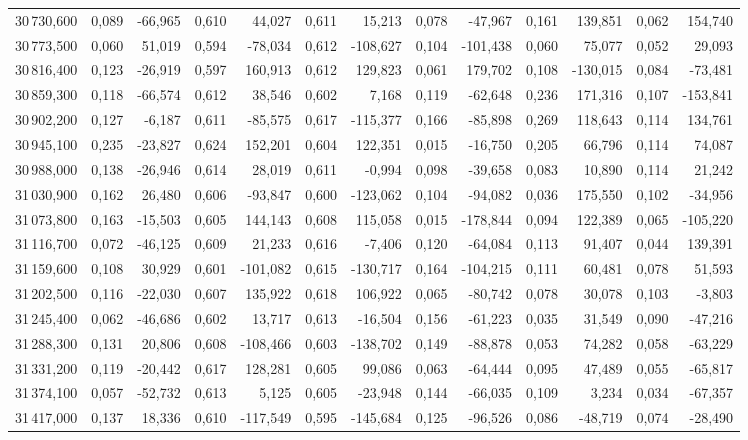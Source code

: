 \begin{longtable}{rrrrrrrrrrrrr}
30\,730,600 & 0,089 & -66,965 & 0,610 & 44,027 & 0,611 & 15,213 & 0,078 & -47,967 & 0,161 & 139,851 & 0,062 & 154,740\\
30\,773,500 & 0,060 & 51,019 & 0,594 & -78,034 & 0,612 & -108,627 & 0,104 & -101,438 & 0,060 & 75,077 & 0,052 & 29,093\\
30\,816,400 & 0,123 & -26,919 & 0,597 & 160,913 & 0,612 & 129,823 & 0,061 & 179,702 & 0,108 & -130,015 & 0,084 & -73,481\\
30\,859,300 & 0,118 & -66,574 & 0,612 & 38,546 & 0,602 & 7,168 & 0,119 & -62,648 & 0,236 & 171,316 & 0,107 & -153,841\\
30\,902,200 & 0,127 & -6,187 & 0,611 & -85,575 & 0,617 & -115,377 & 0,166 & -85,898 & 0,269 & 118,643 & 0,114 & 134,761\\
30\,945,100 & 0,235 & -23,827 & 0,624 & 152,201 & 0,604 & 122,351 & 0,015 & -16,750 & 0,205 & 66,796 & 0,114 & 74,087\\
30\,988,000 & 0,138 & -26,946 & 0,614 & 28,019 & 0,611 & -0,994 & 0,098 & -39,658 & 0,083 & 10,890 & 0,114 & 21,242\\
31\,030,900 & 0,162 & 26,480 & 0,606 & -93,847 & 0,600 & -123,062 & 0,104 & -94,082 & 0,036 & 175,550 & 0,102 & -34,956\\
31\,073,800 & 0,163 & -15,503 & 0,605 & 144,143 & 0,608 & 115,058 & 0,015 & -178,844 & 0,094 & 122,389 & 0,065 & -105,220\\
31\,116,700 & 0,072 & -46,125 & 0,609 & 21,233 & 0,616 & -7,406 & 0,120 & -64,084 & 0,113 & 91,407 & 0,044 & 139,391\\
31\,159,600 & 0,108 & 30,929 & 0,601 & -101,082 & 0,615 & -130,717 & 0,164 & -104,215 & 0,111 & 60,481 & 0,078 & 51,593\\
31\,202,500 & 0,116 & -22,030 & 0,607 & 135,922 & 0,618 & 106,922 & 0,065 & -80,742 & 0,078 & 30,078 & 0,103 & -3,803\\
31\,245,400 & 0,062 & -46,686 & 0,602 & 13,717 & 0,613 & -16,504 & 0,156 & -61,223 & 0,035 & 31,549 & 0,090 & -47,216\\
31\,288,300 & 0,131 & 20,806 & 0,608 & -108,466 & 0,603 & -138,702 & 0,149 & -88,878 & 0,053 & 74,282 & 0,058 & -63,229\\
31\,331,200 & 0,119 & -20,442 & 0,617 & 128,281 & 0,605 & 99,086 & 0,063 & -64,444 & 0,095 & 47,489 & 0,055 & -65,817\\
31\,374,100 & 0,057 & -52,732 & 0,613 & 5,125 & 0,605 & -23,948 & 0,144 & -66,035 & 0,109 & 3,234 & 0,034 & -67,357\\
31\,417,000 & 0,137 & 18,336 & 0,610 & -117,549 & 0,595 & -145,684 & 0,125 & -96,526 & 0,086 & -48,719 & 0,074 & -28,490\\

\end{longtable}
